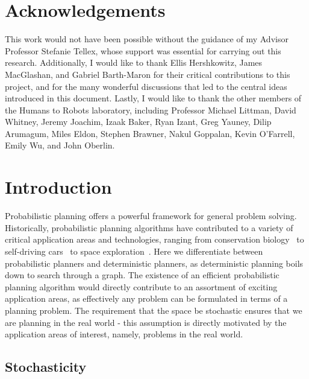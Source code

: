 \documentclass[11pt]{article}
\begin{document}
\section*{Acknowledgements}
This work would not have been possible without the guidance of my Advisor Professor Stefanie Tellex, whose support was essential for carrying out this research. Additionally, I would like to thank Ellis Hershkowitz, James MacGlashan, and Gabriel Barth-Maron for their critical contributions to this project, and for the many wonderful discussions that led to the central ideas introduced in this document. Lastly, I would like to thank the other members of the Humans to Robots laboratory, including Professor Michael Littman, David Whitney, Jeremy Joachim, Izaak Baker, Ryan Izant, Greg Yauney, Dilip Arumagum, Miles Eldon, Stephen Brawner, Nakul Goppalan, Kevin O'Farrell, Emily Wu, and John Oberlin.

\newpage
\tableofcontents
\newpage

\section{Introduction}
\label{sec:introduction}

Probabilistic planning offers a powerful framework for general problem solving. Historically, probabilistic planning algorithms have contributed to a variety of critical application areas and technologies, ranging from conservation biology~\cite{possingham1997state} to self-driving cars~\cite{thrun2006stanley,montemerlo2008junior} to space exploration~\cite{bresina2005activity,backes1999automated,chien2000aspen}. Here we differentiate between probabilistic planners and deterministic planners, as deterministic planning boils down to search through a graph. The existence of an efficient probabilistic planning algorithm would directly contribute to an assortment of exciting application areas, as effectively any problem can be formulated in terms of a planning problem. The requirement that the space be stochastic ensures that we are planning in the real world - this assumption is directly motivated by the application areas of interest, namely, problems in the real world.

\subsection{Stochasticity}
\end{document}
